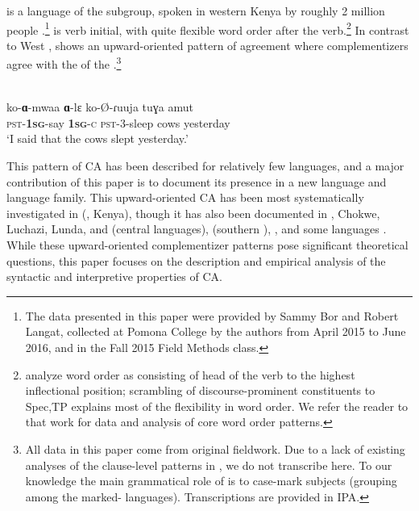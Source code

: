 \documentclass[output=paper,newtxmath,modfonts,nonflat,hidelinks]{langsci/langscibook}
\begin{document}
 is a  language of the  subgroup, spoken in western Kenya by roughly 2 million people \autocite{Lewis:2016}.\footnote{The data presented in this paper were provided by Sammy Bor and Robert Langat, collected at Pomona College by the authors from April 2015 to June 2016, and in the Fall 2015 Field Methods class.}  is verb initial, with quite flexible word order after the verb.\footnote{\citet{BossiDiercks:2018:KipsigisV1} analyze  word order as consisting of head  of the verb to the highest inflectional position;  scrambling of discourse-prominent constituents  to Spec,TP explains most of the flexibility in word order. We refer the reader to that work for data and analysis of  core word order patterns.} In contrast to West ,  shows an upward-oriented pattern of agreement where complementizers agree with the  of the .\footnote{All  data in this paper come from original fieldwork. Due to a lack of existing analyses of the clause-level  patterns in , we do not transcribe  here. To our knowledge the main grammatical role of  is to case-mark  subjects (grouping  among the marked-  languages). Transcriptions are provided in IPA.} 

\ea \label{ex:Diercks,Rao:2}
 \\
\gll	ko-\textbf{ɑ}-mwaa \textbf{ɑ}-lɛ ko-\O-ɾuuja tuɣa amut \\
\textsc{pst}-\textbf{1\textsc{sg}}-say \textbf{1\textsc{sg}}-\textsc{c} \textsc{pst}-3-sleep cows yesterday \\
\glt `I said that the cows slept yesterday.'
\z

\noindent This pattern of CA has been described for relatively few languages, and a major contribution of this paper is to document its presence in a new language and language family. This upward-oriented CA has been most systematically investigated in  (, Kenya), though it has also been documented in , Chokwe, Luchazi, Lunda, and  (central  languages),  (southern ), , and some  languages \citep{Baker:2008b,Diercks:2013,Kawasha:2007,Idiatov:2010,Torrence:2016,LetsholoSafir:2017}. While these upward-oriented complementizer patterns pose significant theoretical questions, this paper focuses on the  description and empirical analysis of the syntactic and interpretive properties of  CA. 
\end{document}
